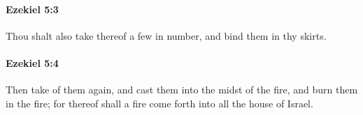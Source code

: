 		\paragraph{Ezekiel 5:3} %
			\label{EZEKIEL-5-3}

			Thou shalt also take thereof a few in number, and bind them in thy skirts.


		\paragraph{Ezekiel 5:4} %
			\label{EZEKIEL-5-4}

			Then take of them again, and cast them into the midst of the fire, and burn them in the fire; for thereof shall a fire come forth into all the house of Israel.


